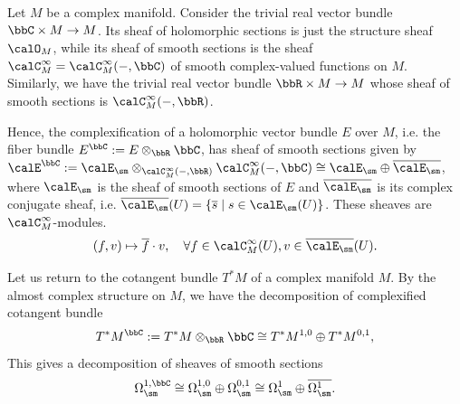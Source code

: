 \begin{example}\label{eg:real_trivial_bundle_C_as_sheaves}
	Let \(M\) be a complex manifold.
	Consider the trivial real vector bundle \(\bbC \times M \to M\).
	Its sheaf of holomorphic sections is just the structure sheaf \(\calO_M\),
	while its sheaf of smooth sections is the sheaf \(\calC_M^\infty = \calC_M^\infty(-,\bbC)\) of smooth complex-valued functions on \(M\).
	Similarly, we have the trivial real vector bundle \(\bbR \times M \to M\) whose sheaf of smooth sections is \(\calC_M^\infty(-,\bbR)\).

	Hence, the complexification of a holomorphic vector bundle \(E\) over \(M\), i.e. the fiber bundle \(E^\bbC := E \otimes_\bbR \bbC\),
	has sheaf of smooth sections given by \(\calE^\bbC := \calE_\sm \otimes_{\calC_M^\infty(-,\bbR)} \calC_M^\infty(-,\bbC) \cong \calE_\sm \oplus \overline{\calE_\sm}\),
	where \(\calE_\sm\) is the sheaf of smooth sections of \(E\) and \(\overline{\calE_\sm}\) is its complex conjugate sheaf, i.e. \(\overline{\calE_\sm}(U) = \{ \overline{s} \mid s \in \calE_\sm(U) \}\).
	These sheaves are \(\calC_M^\infty\)-modules.
	\[ (f, v) \mapsto \overline{f} \cdot v, \quad \forall f \in \calC_M^\infty(U), v \in \overline{\calE_\sm}(U). \]
\end{example}

Let us return to the cotangent bundle \(T^*M\) of a complex manifold \(M\).
By the almost complex structure on \(M\), we have the decomposition of complexified cotangent bundle
\[ T^*M^\bbC := T^*M \otimes_\bbR \bbC \cong T^*M^{1,0} \oplus T^*M^{0,1}, \]
This gives a decomposition of sheaves of smooth sections
\[ \Omega_{\sm}^{1,\bbC} \cong \Omega_{\sm}^{1,0} \oplus \Omega_{\sm}^{0,1} \cong \Omega_{\sm}^1 \oplus \overline{\Omega_{\sm}^1}. \]



